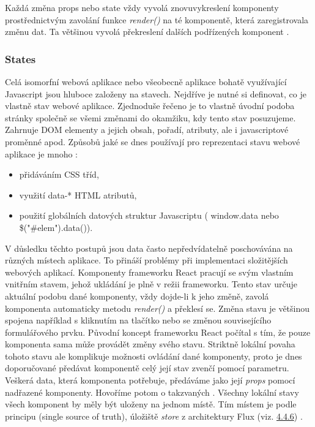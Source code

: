 Každá změna props nebo state vždy vyvolá znovuvykreslení komponenty prostřednictvým zavolání funkce \textit{render()} na té komponentě, která zaregistrovala změnu dat. Ta většinou vyvolá překreslení dalších podřízených komponent \cite{react} \cite{react_components}.

\subsubsection{States}
Celá isomorfní webová aplikace nebo všeobecně aplikace bohatě využívající Javascript jsou hluboce založeny na stavech. Nejdříve je nutné si definovat, co je vlastně stav webové aplikace. Zjednoduše řečeno je to vlastně úvodní podoba stránky společně se všemi změnami do okamžiku, kdy tento stav posuzujeme. Zahrnuje DOM elementy a jejich obsah, pořadí, atributy, ale i javascriptové proměnné apod. Způsobů jaké se dnes používají pro reprezentaci stavu webové aplikace je mnoho \cite{zakas_js} \cite{skriptovaci_jazyky}:

\begin{itemize}
\item přidáváním CSS tříd,
\item využití data-* HTML atributů,
\item použití globálních datových struktur Javascriptu ( window.data nebo \$("\#elem").data()).
\end{itemize}

V důsledku těchto postupů jsou data často nepředvídatelně poschovávána na různých místech aplikace. To přináší problémy při implementaci složitějších webových aplikací. Komponenty frameworku React pracují se svým vlastním vnitřním stavem, jehož ukládání je plně v režii frameworku. Tento stav určuje aktuální podobu dané komponenty, vždy dojde-li k jeho změně, zavolá komponenta automaticky metodu \textit{render()} a překlesí se. Změna stavu je většinou spojena například s kliknutím na tlačítko nebo se změnou souvisejícího formulářového prvku. Původní koncept frameworku React počítal s tím, že pouze komponenta sama může provádět změny svého stavu. Striktně lokální povaha tohoto stavu ale komplikuje možnosti ovládání dané komponenty, proto je dnes doporučované předávat komponentě celý její stav zvenčí pomocí parametru. Veškerá data, která komponenta potřebuje, předáváme jako její \textit{props} pomocí nadřazené komponenty. Hovoříme potom o takzvaných . Všechny lokální stavy všech komponent by měly být uloženy na jednom místě. Tím místem je podle principu  (single source of truth), úložiště \textit{store} z architektury Flux (viz. \hyperref[sec:flux]{4.4.6}) \cite{react} \cite{react_book}  \cite{flux} \cite{react_thinking}.


